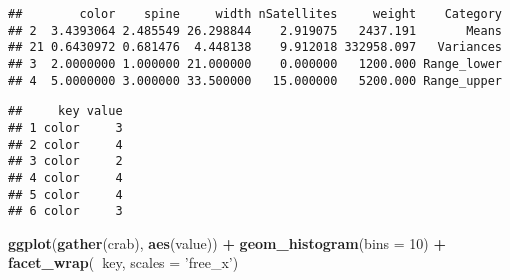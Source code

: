 \documentclass[]{article}
\newenvironment{Shaded}{\begin{snugshade}}{\end{snugshade}}
\newcommand{\KeywordTok}[1]{\textcolor[rgb]{0.13,0.29,0.53}{\textbf{#1}}}
\newcommand{\DataTypeTok}[1]{\textcolor[rgb]{0.13,0.29,0.53}{#1}}
\newcommand{\DecValTok}[1]{\textcolor[rgb]{0.00,0.00,0.81}{#1}}
\newcommand{\StringTok}[1]{\textcolor[rgb]{0.31,0.60,0.02}{#1}}
\newcommand{\OperatorTok}[1]{\textcolor[rgb]{0.81,0.36,0.00}{\textbf{#1}}}
\newcommand{\NormalTok}[1]{#1}
\begin{document}
\begin{Shaded}
\end{Shaded}

\begin{verbatim}
##        color    spine     width nSatellites     weight    Category
## 2  3.4393064 2.485549 26.298844    2.919075   2437.191       Means
## 21 0.6430972 0.681476  4.448138    9.912018 332958.097   Variances
## 3  2.0000000 1.000000 21.000000    0.000000   1200.000 Range_lower
## 4  5.0000000 3.000000 33.500000   15.000000   5200.000 Range_upper
\end{verbatim}

\begin{Shaded}
\end{Shaded}

\begin{verbatim}
##     key value
## 1 color     3
## 2 color     4
## 3 color     2
## 4 color     4
## 5 color     4
## 6 color     3
\end{verbatim}

\begin{Shaded}
\begin{Highlighting}[]
\KeywordTok{ggplot}\NormalTok{(}\KeywordTok{gather}\NormalTok{(crab), }\KeywordTok{aes}\NormalTok{(value)) }\OperatorTok{+}\StringTok{ }
\StringTok{    }\KeywordTok{geom_histogram}\NormalTok{(}\DataTypeTok{bins =} \DecValTok{10}\NormalTok{) }\OperatorTok{+}\StringTok{ }
\StringTok{    }\KeywordTok{facet_wrap}\NormalTok{(}\OperatorTok{~}\NormalTok{key, }\DataTypeTok{scales =} \StringTok{'free_x'}\NormalTok{)}
\end{Highlighting}
\end{Shaded}
\end{document}
